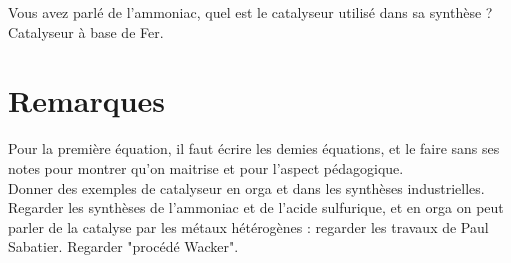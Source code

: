 \documentclass[12pt,prb,aps,epsf]{article}
\begin{document}
Vous avez parlé de l'ammoniac, quel est le catalyseur utilisé dans sa synthèse ?\\
Catalyseur à base de Fer.

\section*{Remarques}
Pour la première équation, il faut écrire les demies équations, et le faire sans ses notes pour montrer qu'on maitrise et pour l'aspect pédagogique.\\
Donner des exemples de catalyseur en orga et dans les synthèses industrielles.
Regarder les synthèses de l'ammoniac et de l'acide sulfurique, et en orga on peut parler de la catalyse par les métaux hétérogènes : regarder les travaux de Paul Sabatier. Regarder "procédé Wacker".

	
	
\end{document}
